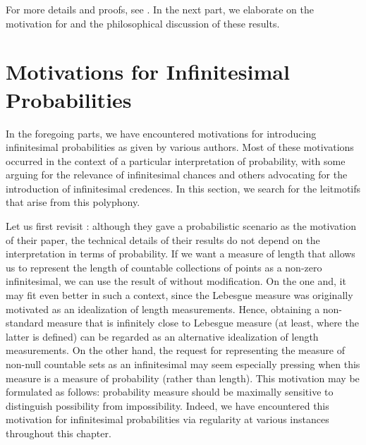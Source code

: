 For more details and proofs, see \citet{Benci_etal:2013}. In the next part, we elaborate on the motivation for and the philosophical discussion of these results.

{}\label{part:phil}
\section{Motivations for Infinitesimal Probabilities}
In the foregoing parts, we have encountered motivations for introducing infinitesimal probabilities as given by various authors. Most of these motivations occurred in the context of a particular interpretation of probability, with some arguing for the relevance of infinitesimal chances and others advocating for the introduction of infinitesimal credences. In this section, we search for the leitmotifs that arise from this polyphony.

Let us first revisit \citet{BernsteinWattenberg:1969}: although they gave a probabilistic scenario as the motivation of their paper, the technical details of their results do not depend on the interpretation in terms of probability. If we want a measure of length that allows us to represent the length of countable collections of points as a non-zero infinitesimal, we can use the result of \citet{BernsteinWattenberg:1969} without modification. On the one and, it may fit even better in such a context, since the Lebesgue measure was originally motivated as an idealization of length measurements. Hence, obtaining a non-standard measure that is infinitely close to Lebesgue measure (at least, where the latter is defined) can be regarded as an alternative idealization of length measurements.
On the other hand, the request for representing the measure of non-null countable sets as an infinitesimal may seem especially pressing when this measure is a measure of probability (rather than length).
This motivation may be formulated as follows: probability measure should be maximally sensitive to distinguish possibility from impossibility.
Indeed, we have encountered this motivation for infinitesimal probabilities via regularity at various instances throughout this chapter.

